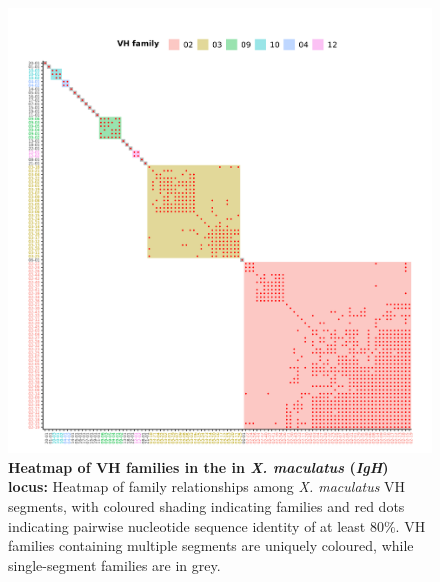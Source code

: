 	\begin{figure}
	\centering
	\includegraphics[width=\textwidth]{_Figures/png/xma-vh-families-map}
	\caption[Heatmap of VH families in the in \textit{X. maculatus} \textit{IgH} locus]{\textbf{Heatmap of VH families in the in \textit{X. maculatus} (\textit{IgH}) locus:} Heatmap of family relationships among \textit{X. maculatus} VH segments, with coloured shading indicating families and red dots indicating pairwise nucleotide sequence identity of at least 80\%. VH families containing multiple segments are uniquely coloured, while single-segment families are in grey.}
	\label{fig:xma-vh-families-map}
	\end{figure}
	
